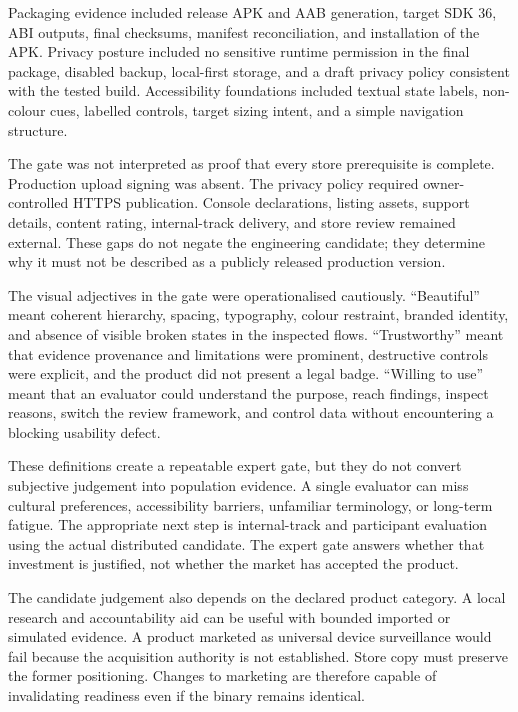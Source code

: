 Packaging evidence included release APK and AAB generation, target SDK 36, ABI outputs, final checksums, manifest reconciliation, and installation of the APK. Privacy posture included no sensitive runtime permission in the final package, disabled backup, local-first storage, and a draft privacy policy consistent with the tested build. Accessibility foundations included textual state labels, non-colour cues, labelled controls, target sizing intent, and a simple navigation structure.

The gate was not interpreted as proof that every store prerequisite is complete. Production upload signing was absent. The privacy policy required owner-controlled HTTPS publication. Console declarations, listing assets, support details, content rating, internal-track delivery, and store review remained external. These gaps do not negate the engineering candidate; they determine why it must not be described as a publicly released production version.

The visual adjectives in the gate were operationalised cautiously. ``Beautiful'' meant coherent hierarchy, spacing, typography, colour restraint, branded identity, and absence of visible broken states in the inspected flows. ``Trustworthy'' meant that evidence provenance and limitations were prominent, destructive controls were explicit, and the product did not present a legal badge. ``Willing to use'' meant that an evaluator could understand the purpose, reach findings, inspect reasons, switch the review framework, and control data without encountering a blocking usability defect.

These definitions create a repeatable expert gate, but they do not convert subjective judgement into population evidence. A single evaluator can miss cultural preferences, accessibility barriers, unfamiliar terminology, or long-term fatigue. The appropriate next step is internal-track and participant evaluation using the actual distributed candidate. The expert gate answers whether that investment is justified, not whether the market has accepted the product.

The candidate judgement also depends on the declared product category. A local research and accountability aid can be useful with bounded imported or simulated evidence. A product marketed as universal device surveillance would fail because the acquisition authority is not established. Store copy must preserve the former positioning. Changes to marketing are therefore capable of invalidating readiness even if the binary remains identical.

